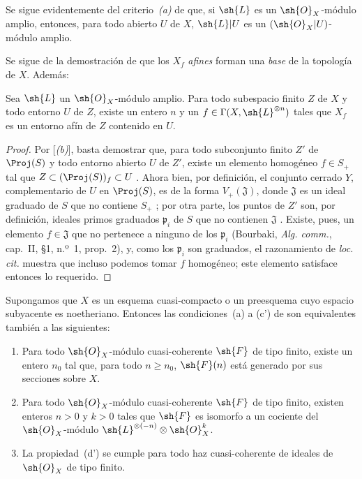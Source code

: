 \documentclass[oneside,10pt]{amsart}
\renewcommand{\geq}{\geqslant}
\newcommand{\oldpage}[2][]{\marginnote{\normalfont\footnotesize\textbf{#1}~|~#2}\ignorespaces}
\let\EGAOriginalLabel\label
\renewcommand{\label}[1]{\phantomsection\EGAOriginalLabel{#1}}
\begin{document}
Se sigue evidentemente del criterio~\emph{(a)} de  que, si $\sh{L}$ es un $\sh{O}_X$-módulo amplio, entonces, para todo abierto $U$ de $X$, $\sh{L}|U$ es un $(\sh{O}_X|U)$-módulo amplio.

Se sigue de la demostración de  que los $X_f$ \emph{afines} forman una \emph{base} de la topología de $X$.
Además:

\begin{corollary}[4.5.4]
\label{II.4.5.4}
Sea $\sh{L}$ un $\sh{O}_X$-módulo amplio.
Para todo subespacio finito $Z$ de $X$ y todo entorno $U$ de $Z$, existe un entero $n$ y un $f\in\Gamma(X,\sh{L}^{\otimes n})$ tales que $X_f$ es un entorno afín de $Z$ contenido en $U$.
\end{corollary}

\begin{proof}
\oldpage[II]{85}
Por [\emph{(b)}], basta demostrar que, para todo subconjunto finito $Z'$ de $\Proj(S)$ y todo entorno abierto $U$ de $Z'$, existe un elemento homogéneo $f\in S_+$ tal que $Z\subset(\Proj(S))_f\subset U$ .
Ahora bien, por definición, el conjunto cerrado $Y$, complementario de $U$ en $\Proj(S)$, es de la forma $V_+(\mathfrak J)$, donde $\mathfrak J$ es un ideal graduado de $S$ que no contiene $S_+$ ;
por otra parte, los puntos de $Z'$ son, por definición, ideales primos graduados $\mathfrak{p}_i$ de $S$ que no contienen $\mathfrak J$ .
Existe, pues, un elemento $f\in\mathfrak J$ que no pertenece a ninguno de los $\mathfrak{p}_i$ (Bourbaki, \emph{Alg. comm.}, cap.~II, \S1, n.º~1, prop.~2), y, como los $\mathfrak{p}_i$ son graduados, el razonamiento de \emph{loc. cit.} muestra que incluso podemos tomar $f$ homogéneo;
este elemento satisface entonces lo requerido.
\end{proof}

\begin{proposition}[4.5.5]
\label{II.4.5.5}
Supongamos que $X$ es un esquema cuasi-compacto o un preesquema cuyo espacio subyacente es noetheriano.
Entonces las condiciones~\textup{(a)} a \textup{(c')} de  son equivalentes también a las siguientes:
\begin{enumerate}
  \item[\rm{(d)}] Para todo $\sh{O}_X$-módulo cuasi-coherente $\sh{F}$ de tipo finito, existe un entero $n_0$ tal que, para todo $n\geq n_0$, $\sh{F}(n)$ está generado por sus secciones sobre $X$.
  \item[\rm{(d')}] Para todo $\sh{O}_X$-módulo cuasi-coherente $\sh{F}$ de tipo finito, existen enteros $n>0$ y $k>0$ tales que $\sh{F}$ es isomorfo a un cociente del $\sh{O}_X$-módulo $\sh{L}^{\otimes(-n)}\otimes\sh{O}_X^k$.
  \item[\rm{(d'')}] La propiedad~\textup{(d')} se cumple para todo haz cuasi-coherente de ideales de $\sh{O}_X$ de tipo finito.
\end{enumerate}
\end{proposition}
\end{document}
